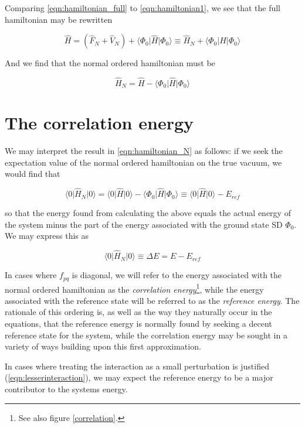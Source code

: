 Comparing \ref{eqn:hamiltonian_full} to \ref{eqn:hamiltonian1}, we see that the full hamiltonian may be rewritten

\begin{equation}
\hat{H} = 
(\hat{F}_N + 
\hat{V}_N) +
\langle \Phi_0 \vert \hat{H} \vert \Phi_0 \rangle \equiv 
\hat{H}_N +
\langle \Phi_0 \vert \hat{H} \vert \Phi_0 \rangle
\label{eqn:hamiltonian_full_N}
\end{equation}

And we find that the normal ordered hamiltonian must be

\begin{equation}
\hat{H}_N = 
\hat{H}  -
\langle \Phi_0 \vert \hat{H} \vert \Phi_0 \rangle
\label{eqn:hamiltonian_N}
\end{equation}

\section{The correlation energy}

We may interpret the result in \ref{eqn:hamiltonian_N} as follows: if we seek the expectation value of the normal ordered hamiltonian on the true vacuum, we would find that 

\begin{equation}
\langle 0 \vert \hat{H}_N  \vert 0 \rangle = 
\langle 0 \vert \hat{H}  \vert 0 \rangle -
\langle \Phi_0 \vert \hat{H} \vert \Phi_0 \rangle \equiv
\langle 0 \vert \hat{H}  \vert 0 \rangle -
E_{ref}
\label{eqn:hamiltonian_N_vacuum}
\end{equation}

so that the energy found from calculating the above equals the actual energy of the system minus the part of the energy associated with the ground state SD $\Phi_0$. We may express this as

\begin{equation}
\langle 0 \vert \hat{H}_N  \vert 0 \rangle \equiv \Delta E = E - E_{ref}
\label{eqn:correlation_energy}
\end{equation}

In cases where $f_{pq}$ is diagonal, we will refer to the energy associated with the normal ordered hamiltonian as the \emph{correlation energy}\footnote{See also figure \ref{correlation}.}, while the energy associated with the reference state will be referred to as the \emph{reference energy}. The rationale of this ordering is, as well as the way they naturally occur in the equations, that the reference energy is normally found by seeking a decent reference state for the system, while the correlation energy may be sought in a variety of ways building upon this first approximation. 

In cases where treating the interaction as a small perturbation is justified (\ref{eqn:lesserinteraction}), we may expect the reference energy to be a major contributor to the systems energy.


